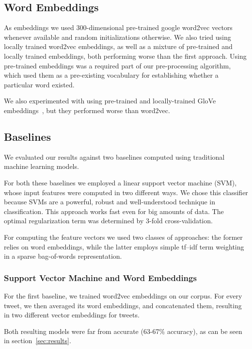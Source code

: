 \documentclass[10pt,conference,compsocconf]{IEEEtran}
\begin{document}
\subsection{Word Embeddings}
\label{sec:embeddings}

As embeddings we used 300-dimensional pre-trained google word2vec vectors
whenever available and random initializations otherwise.
We also tried using locally trained word2vec embeddings, as well as a mixture
of pre-trained and locally trained embeddings, both performing worse than the first approach.
Using pre-trained embeddings was a required part of our pre-processing
algorithm, which used them as a pre-existing vocabulary for establishing
whether a particular word existed.

We also experimented with using pre-trained and locally-trained GloVe embeddings~\cite{pennington2014glove},
but they performed worse than word2vec.


\subsection{Baselines}
\label{sec:baselines}

We evaluated our results against two baselines computed using traditional
machine learning models. 

For both these baselines we employed a linear support vector machine (SVM),
whose input features were computed in two different ways. We chose this
classifier because SVMs are a powerful, robust and well-understood technique in classification. 
This approach works fast even for big amounts of data. The optimal regularization
term was determined by 3-fold cross-validation. 

For computing the feature vectors we used two classes of approaches: the former
relies on word embeddings, while the latter employs simple tf--idf term weighting
in a sparse bag-of-words representation.

\subsubsection{Support Vector Machine and Word Embeddings}
For the first baseline, we trained word2vec embeddings on our corpus. For every
tweet, we then averaged its word embeddings, and concatenated them, resulting
in two different vector embeddings for tweets.

Both resulting models were far from accurate (63-67\% accuracy), as can be seen in
section~\ref{sec:results}.
\end{document}
